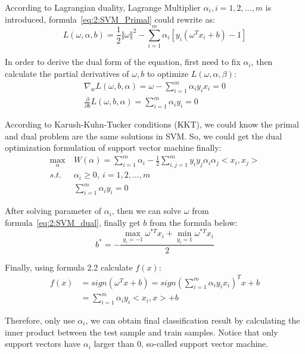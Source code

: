 \documentclass[master]{IPSstyle}
\begin{document}
According to Lagrangian duality, Lagrange Multiplier $\alpha_i, i = 1,2,\dots, m$ is introduced, formula~\ref{eq:2:SVM_Primal} could rewrite as:
\begin{equation}
L \left(\omega, \alpha, b\right) = \frac{1}{2}\Vert\omega\Vert^2 - \sum_{i=1}^m\alpha_i\left[y_i(\omega^Tx_i + b) - 1\right]
\end{equation}

In order to derive the dual form of the equation, first need to fix $\alpha_i$, then calculate the partial derivatives of $\omega, b$ to optimize $L(\omega, \alpha, \beta)$:
\begin{align}
\nabla_w L(\omega, b, \alpha) = \omega - \sum_{i=1}^m\alpha_iy_ix_i = 0 \\
\frac{\partial}{\partial b}L(\omega, b, \alpha) = \sum_{i=1}^m\alpha_iy_i = 0
\end{align}

According to Karush-Kuhn-Tucker conditions (KKT), we could know the primal and dual problem are the same solutions in SVM. So, we could get the dual optimization formulation of support vector machine finally:
\begin{equation} \label{eq:2:SVM_dual}
\begin{aligned}
\max_{\alpha} ~ &W(\alpha)=\sum_{i=1}^{m}\alpha_i-\frac{1}{2}\sum_{i,j=1}^{m}y_iy_j\alpha_i\alpha_j<x_i,x_j>\\
s.t. ~ &\alpha_i\geq0, ~ i=1,2,...,m\\
&\sum_{i=1}^{m}\alpha_iy_i=0
\end{aligned}
\end{equation}

After solving parameter of $\alpha_i$, then we can solve $\omega$ from formula~\ref{eq:2:SVM_dual}, finally get $b$ from the formula below:
\begin{equation}
b^\ast = -\frac{\max_{y_i=-1}\omega^{\ast T}x_i + \min_{y_i=1}\omega^{\ast T}x_i}{2}
\end{equation}

Finally, using formula 2.2 calculate $f(x)$:
\begin{equation} \label{eq:2:SVM_dual_final}
\begin{aligned}
f(x) &= sign(\omega^Tx+b) = sign(\sum_{i=1}^m\alpha_iy_ix_i)^Tx+b \\
&= \sum_{i=1}^m\alpha_iy_i<x_i, x> + b
\end{aligned}
\end{equation}

Therefore, only use $\alpha_i$, we can obtain final classification result by calculating the inner product between the test sample and train samples. Notice that only support vectors have $\alpha_i$ larger than 0, so-called support vector machine.
\end{document}
